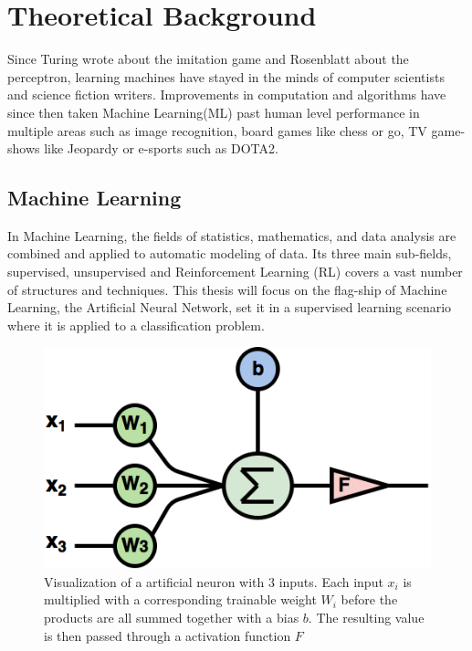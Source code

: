 \chapter{Theoretical Background}
Since Turing wrote about the imitation game\cite{imitationgame} and Rosenblatt about the perceptron\cite{perceptron}, learning machines have stayed in the minds of computer scientists and science fiction writers. 
Improvements in computation and algorithms have since then taken Machine Learning(ML) past human level performance in multiple areas such as image recognition\cite{youtubecats}\cite{deepface}, board games like chess\cite{alphazero} or go\cite{alphago}, TV game-shows like Jeopardy\cite{jeopardy} or e-sports such as DOTA2\cite{dota2}.

\section{Machine Learning}
\label{background:ML}
 
In Machine Learning, the fields of statistics, mathematics, and data analysis are combined and applied to automatic modeling of data. Its three main sub-fields, supervised, unsupervised and Reinforcement Learning (RL) covers a vast number of structures and techniques. This thesis will focus on the flag-ship of Machine Learning, the Artificial Neural Network,  set it in a supervised learning scenario where it is applied to a classification problem.

\begin{figure}[ht] 
\centering
\includegraphics[width=0.7\linewidth]{Chapters/2.Background/figures/artificial_neuron.png}
\caption[Visualization of a artificial neuron]{Visualization of a artificial neuron with 3 inputs. Each input \(x_{i}\) is multiplied with a corresponding trainable weight \(W_{i}\) before the products are all summed together with a bias \(b\). The resulting value is then passed through a activation function \(F\)}
\label{fig:artificialneuron}
\end{figure}

